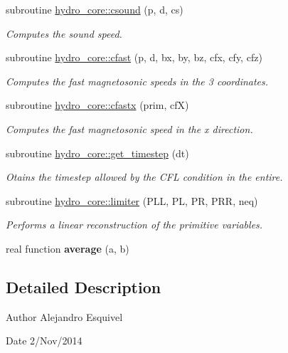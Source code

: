 \begin{DoxyCompactItemize}
subroutine \hyperlink{namespacehydro__core_a27cb7ddb40cc0226e0139bd9eba42dfa}{hydro\+\_\+core\+::csound} (p, d, cs)
\begin{DoxyCompactList}\small\item\em Computes the sound speed. \end{DoxyCompactList}\item 
subroutine \hyperlink{namespacehydro__core_ab2655b81626d4d95cb003112248e928a}{hydro\+\_\+core\+::cfast} (p, d, bx, by, bz, cfx, cfy, cfz)
\begin{DoxyCompactList}\small\item\em Computes the fast magnetosonic speeds in the 3 coordinates. \end{DoxyCompactList}\item 
subroutine \hyperlink{namespacehydro__core_abd089f71325e32997703c1420db62aa8}{hydro\+\_\+core\+::cfastx} (prim, cf\+X)
\begin{DoxyCompactList}\small\item\em Computes the fast magnetosonic speed in the x direction. \end{DoxyCompactList}\item 
subroutine \hyperlink{namespacehydro__core_a0b0402ba5c94d738eb020f79783f8d53}{hydro\+\_\+core\+::get\+\_\+timestep} (dt)
\begin{DoxyCompactList}\small\item\em Otains the timestep allowed by the C\+F\+L condition in the entire. \end{DoxyCompactList}\item 
subroutine \hyperlink{namespacehydro__core_ada63ca89d1a40cfd1a62db0ddfdbda80}{hydro\+\_\+core\+::limiter} (P\+L\+L, P\+L, P\+R, P\+R\+R, neq)
\begin{DoxyCompactList}\small\item\em Performs a linear reconstruction of the primitive variables. \end{DoxyCompactList}\item 
\hypertarget{hydro__core_8f90_a6d27fe4138b4de2f5bb7448e9eafc4ee}{}real function {\bfseries average} (a, b)\label{hydro__core_8f90_a6d27fe4138b4de2f5bb7448e9eafc4ee}

\end{DoxyCompactItemize}


\subsection{Detailed Description}
\begin{DoxyAuthor}{Author}
Alejandro Esquivel 
\end{DoxyAuthor}
\begin{DoxyDate}{Date}
2/\+Nov/2014 
\end{DoxyDate}
